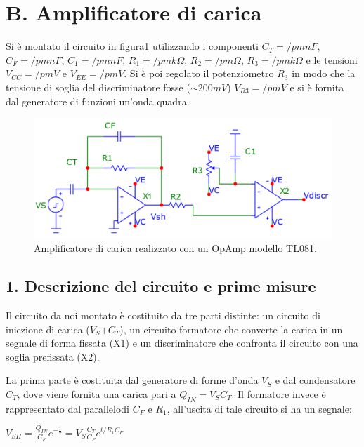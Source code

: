 \documentclass[10pt,a4paper]{article}
\begin{document}
\section*{B. Amplificatore di carica}

Si è montato il circuito in figura\ref{circuito2} utilizzando i componenti $C_T = /pm nF$, $C_F = /pm nF$, $C_1 = /pm nF$, $R_1 = /pm k \Omega$, $R_2 = /pm \Omega$, $R_3 = /pm k \Omega$ e le tensioni $V_{CC} = /pm V$ e $V_{EE} = /pm V$. Si è poi regolato il potenziometro $R_3$ in modo che la tensione di soglia del discriminatore fosse ($\sim 200mV$) $V_{R3} = /pm V$ e si è fornita dal generatore di funzioni un'onda quadra.\\
\begin{figure}[h]
\centering
\includegraphics[scale=0.5]{amplificatoreCarica.png}
\caption{Amplificatore di carica realizzato con un OpAmp modello TL081.\label{circuito2}}
\end{figure}

\subsection*{1. Descrizione del circuito e prime misure}
Il circuito da noi montato è costituito da tre parti distinte: un circuito di iniezione di carica ($V_S$+$C_T$), un circuito formatore che converte la carica in un segnale di forma fissata (X1) e un discriminatore che confronta il circuito con una soglia prefissata (X2).


La prima parte è costituita dal generatore di forme d'onda $V_S$ e dal condensatore $C_T$, dove viene fornita una carica pari a $Q_{IN}=V_S C_T$. Il formatore invece è rappresentato dal parallelodi $C_F$ e $R_1$, all'uscita di tale circuito si ha un segnale:\\
\begin{center}
$V_{SH}=\frac{Q_{IN}}{C_F} e^{-\frac{t}{\tau}} = V_S \frac{C_T}{C_F} e^{t/R_1 C_F}$\\
\end{center}
\end{document}
